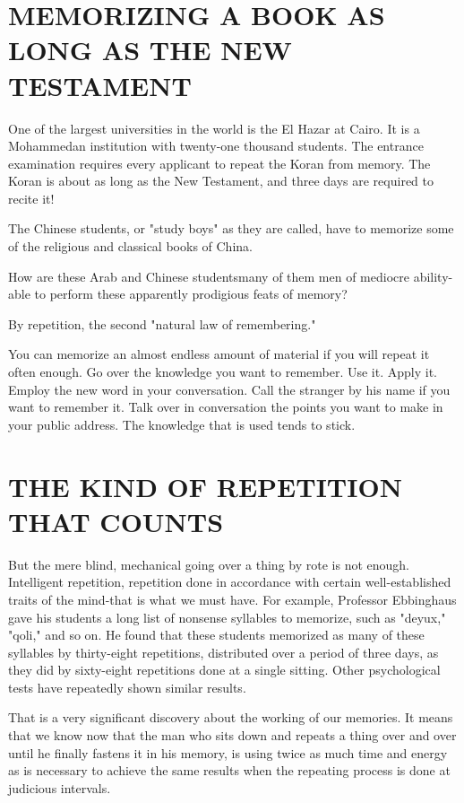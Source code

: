 \documentclass[10pt]{article}
\begin{document}
\section*{MEMORIZING A BOOK AS LONG AS THE NEW TESTAMENT}
One of the largest universities in the world is the El Hazar at Cairo. It is a Mohammedan institution with twenty-one thousand students. The entrance examination requires every applicant to repeat the Koran from memory. The Koran is about as long as the New Testament, and three days are required to recite it!

The Chinese students, or "study boys" as they are called, have to memorize some of the religious and classical books of China.

How are these Arab and Chinese studentsmany of them men of mediocre ability-able to perform these apparently prodigious feats of memory?

By repetition, the second "natural law of remembering."

You can memorize an almost endless amount of material if you will repeat it often enough. Go over the knowledge you want to remember. Use it. Apply it. Employ the new word in your conversation. Call the stranger by his name if you want to remember it. Talk over in conversation the points you want to make in your public address. The knowledge that is used tends to stick.

\section*{THE KIND OF REPETITION THAT COUNTS}
But the mere blind, mechanical going over a thing by rote is not enough. Intelligent repetition, repetition done in accordance with certain well-established traits of the mind-that is what we must have. For example, Professor Ebbinghaus gave his students a long list of nonsense syllables to memorize, such as "deyux," "qoli," and so on. He found that these students memorized as many of these syllables by thirty-eight repetitions, distributed over a period of three days, as they did by sixty-eight repetitions done at a single sitting. Other psychological tests have repeatedly shown similar results.

That is a very significant discovery about the working of our memories. It means that we know now that the man who sits down and repeats a thing over and over until he finally fastens it in his memory, is using twice as much time and energy as is necessary to achieve the same results when the repeating process is done at judicious intervals.
\end{document}
